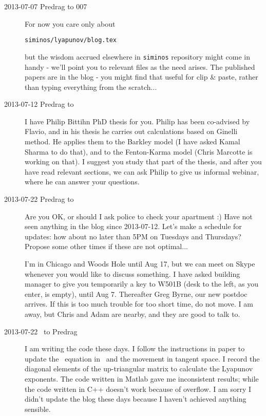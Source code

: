 \begin{description}
\item[2013-07-07 Predrag to 007] For now you care only about
\begin{verbatim}
siminos/lyapunov/blog.tex
\end{verbatim}
 but the wisdom accrued
elsewhere in \texttt{siminos} repository might come in handy -
we'll point you to relevant files as the need arises. The
published papers are in the blog - you might find that useful
for clip \& paste, rather than typing everything from the scratch...

\item[2013-07-12 Predrag to \XD]
I have  {Philip
Bittihn} PhD thesis for you. Philip has been
co-advised by Flavio, and in his thesis he carries out {\cLv} calculations based on Ginelli
\etal{} method. He applies them to the Barkley
model (I have asked Kamal Sharma to do that), and to the Fenton-Karma
model (Chris Marcotte is working on that). I suggest you study that
part of the thesis, and after you have read relevant sections, we can
ask Philip to give us informal webinar, where he can answer your
questions.

\item[2013-07-22 Predrag to \XD] Are you OK, or should I ask police to check
your apartment :) Have not seen anything in the blog since 2013-07-12. Let's
make a schedule for updates: how about no later than 5PM on Tuesdays and Thursdays?
Propose some other times if these are not optimal...

I'm in Chicago and
 {Woods Hole}
until Aug 17, but we can meet on Skype whenever you would like to discuss
something. I have asked building manager to give you temporarily a key to
W501B (desk to the left, as you enter, is empty), until Aug 7.
Thereafter Greg Byrne, our new
postdoc arrives. If this is too much trouble for too short time, do not move.
I am away, but Chris and Adam are nearby, and they are good to talk to.

\item[2013-07-22 \XD\ to Predrag] I am writing the code these
    days. I follow the instructions in paper  to update
    the \KS\ equation in \statesp\ and the movement in tangent space. I
    record the diagonal elements of the up-triangular matrix to
    calculate the Lyapunov exponents. The code written in Matlab gave
    me inconsistent results; while the code written in C++ doesn't work
    because of overflow. I am sorry I didn't update the blog these days
    because I haven't achieved anything sensible.


\end{description}
